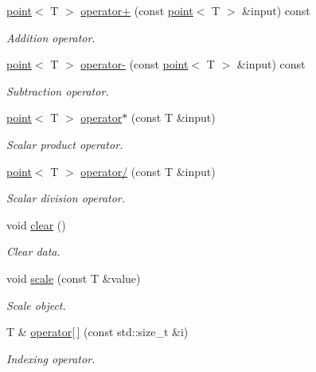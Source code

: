 \begin{DoxyCompactItemize}
\hyperlink{classddd_1_1point}{point}$<$ T $>$ \hyperlink{classddd_1_1point_ab0b0c990b117bb889d34d44509b645be}{operator+} (const \hyperlink{classddd_1_1point}{point}$<$ T $>$ \&input) const
\begin{DoxyCompactList}\small\item\em Addition operator. \end{DoxyCompactList}\item 
\hyperlink{classddd_1_1point}{point}$<$ T $>$ \hyperlink{classddd_1_1point_a5621f5a883c88d5588e09f9ff0de6575}{operator-\/} (const \hyperlink{classddd_1_1point}{point}$<$ T $>$ \&input) const
\begin{DoxyCompactList}\small\item\em Subtraction operator. \end{DoxyCompactList}\item 
\hyperlink{classddd_1_1point}{point}$<$ T $>$ \hyperlink{classddd_1_1point_a4291cf7411bd02324731a13143d718c6}{operator$\ast$} (const T \&input)
\begin{DoxyCompactList}\small\item\em Scalar product operator. \end{DoxyCompactList}\item 
\hyperlink{classddd_1_1point}{point}$<$ T $>$ \hyperlink{classddd_1_1point_a9f347ae983daa189f3d7a127dbacc057}{operator/} (const T \&input)
\begin{DoxyCompactList}\small\item\em Scalar division operator. \end{DoxyCompactList}\item 
\mbox{\label{classddd_1_1point_ade1021a86b26ec7212cb83ebfd3b711f}} 
void \hyperlink{classddd_1_1point_ade1021a86b26ec7212cb83ebfd3b711f}{clear} ()
\begin{DoxyCompactList}\small\item\em Clear data. \end{DoxyCompactList}\item 
void \hyperlink{classddd_1_1point_abcfac6d6f3992972e64595ac795cefbb}{scale} (const T \&value)
\begin{DoxyCompactList}\small\item\em Scale object. \end{DoxyCompactList}\item 
T \& \hyperlink{classddd_1_1point_aabf1454e1f0496fb70c1e62852aa2595}{operator\mbox{[}$\,$\mbox{]}} (const std\+::size\+\_\+t \&i)
\begin{DoxyCompactList}\small\item\em Indexing operator. \end{DoxyCompactList}\item 

\end{DoxyCompactItemize}
